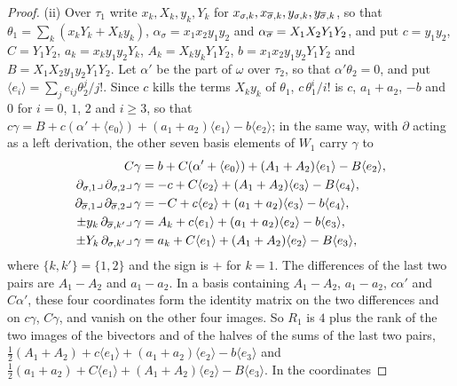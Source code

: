 \begin{proof}
(ii) Over $\tau_{1}$ write $x_{k},X_{k},y_{k},Y_{k}$ for $x_{\sigma,k},
x_{\overline{\sigma},k},y_{\sigma,k},y_{\overline{\sigma},k}$, so that
$\theta_{1}=\sum_{k}(x_{k}Y_{k}+X_{k}y_{k})$, $\alpha_{\sigma}=x_{1}x_{2}y_{1}y_{2}$
and $\alpha_{\overline{\sigma}}=X_{1}X_{2}Y_{1}Y_{2}$, and put $c=y_{1}y_{2}$,
$C=Y_{1}Y_{2}$, $a_{k}=x_{k}y_{1}y_{2}Y_{k}$, $A_{k}=X_{k}y_{k}Y_{1}Y_{2}$,
$b=x_{1}x_{2}y_{1}y_{2}Y_{1}Y_{2}$ and $B=X_{1}X_{2}y_{1}y_{2}Y_{1}Y_{2}$. Let
$\alpha'$ be the part of $\omega$ over $\tau_{2}$, so that $\alpha'\theta_{2}=0$,
and put $\langle e_{i}\rangle=\sum_{j}e_{ij}\theta_{2}^{j}/j!$. Since $c$ kills
the terms $X_{k}y_{k}$ of $\theta_{1}$, $c\,\theta_{1}^{i}/i!$ is $c$,
$a_{1}+a_{2}$, $-b$ and $0$ for $i=0$, $1$, $2$ and $i\ge3$, so that
$c\gamma=B+c(\alpha'+\langle e_{0}\rangle)+(a_{1}+a_{2})\langle e_{1}\rangle
-b\langle e_{2}\rangle$; in the same way, with $\partial$ acting as a left
derivation, the other seven basis elements of $W_{1}$ carry $\gamma$ to
\begin{align*}
  C\gamma&=b+C(\alpha'+\langle e_{0}\rangle)+(A_{1}+A_{2})\langle e_{1}\rangle
    -B\langle e_{2}\rangle,\\
  \partial_{\sigma,1}\lrcorner\,\partial_{\sigma,2}\lrcorner\,\gamma&=
    -c+C\langle e_{2}\rangle+(A_{1}+A_{2})\langle e_{3}\rangle-B\langle e_{4}\rangle,\\
  \partial_{\overline{\sigma},1}\lrcorner\,\partial_{\overline{\sigma},2}\lrcorner\,\gamma&=
    -C+c\langle e_{2}\rangle+(a_{1}+a_{2})\langle e_{3}\rangle-b\langle e_{4}\rangle,\\
  \pm y_{k}\,\partial_{\overline{\sigma},k'}\lrcorner\,\gamma&=
    A_{k}+c\langle e_{1}\rangle+(a_{1}+a_{2})\langle e_{2}\rangle-b\langle e_{3}\rangle,\\
  \pm Y_{k}\,\partial_{\sigma,k'}\lrcorner\,\gamma&=
    a_{k}+C\langle e_{1}\rangle+(A_{1}+A_{2})\langle e_{2}\rangle-B\langle e_{3}\rangle,
\end{align*}
where $\{k,k'\}=\{1,2\}$ and the sign is $+$ for $k=1$. The differences of
the last two pairs are $A_{1}-A_{2}$ and $a_{1}-a_{2}$. In a basis containing
$A_{1}-A_{2}$, $a_{1}-a_{2}$, $c\alpha'$ and $C\alpha'$, these four
coordinates form the identity matrix on the two differences and on $c\gamma$,
$C\gamma$, and vanish on the other four images. So $R_{1}$ is $4$ plus the rank of the two
images of the bivectors and of the halves of the sums of the last two pairs,
$\tfrac12(A_{1}+A_{2})+c\langle e_{1}\rangle+(a_{1}+a_{2})\langle e_{2}\rangle
-b\langle e_{3}\rangle$ and $\tfrac12(a_{1}+a_{2})+C\langle e_{1}\rangle+
(A_{1}+A_{2})\langle e_{2}\rangle-B\langle e_{3}\rangle$. In the coordinates

\end{proof}
